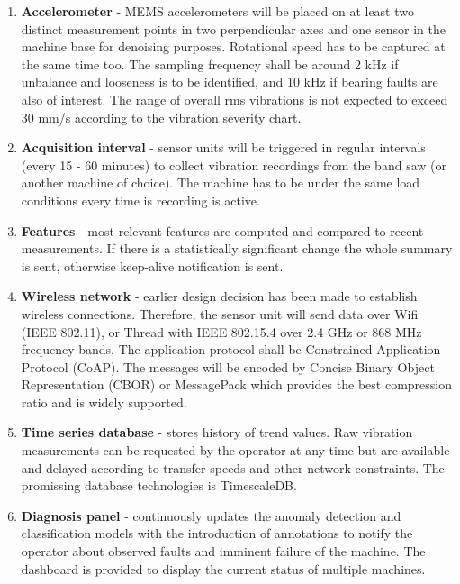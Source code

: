 \begin{enumerate}
\itemsep0pt
\item \textbf{Accelerometer} - MEMS accelerometers will be placed on at least two distinct measurement points in two perpendicular axes and one sensor in the machine base for denoising purposes. Rotational speed has to be captured at the same time too. The sampling frequency shall be around 2 kHz if unbalance and looseness is to be identified, and 10 kHz if bearing faults are also of interest. The range of overall rms vibrations is not expected to exceed 30 mm/s according to the vibration severity chart.
\item \textbf{Acquisition interval} - sensor units will be triggered in regular intervals (every 15 - 60 minutes) to collect vibration recordings from the band saw (or another machine of choice). The machine has to be under the same load conditions every time is recording is active. 
\item \textbf{Features} - most relevant features are computed and compared to recent measurements. If there is a statistically significant change the whole summary is sent, otherwise keep-alive notification is sent. 
\item \textbf{Wireless network} - earlier design decision has been made to establish wireless connections. Therefore, the sensor unit will send data over Wifi (IEEE 802.11), or Thread with IEEE 802.15.4 over 2.4 GHz or 868 MHz frequency bands. The application protocol shall be Constrained Application Protocol (CoAP). The messages will be encoded by Concise Binary Object Representation (CBOR) or MessagePack which provides the best compression ratio and is widely supported.
\item \textbf{Time series database} - stores history of trend values. Raw vibration measurements can be requested by the operator at any time but are available and delayed according to transfer speeds and other network constraints. The promissing database technologies is TimescaleDB.
\item \textbf{Diagnosis panel} - continuously updates the anomaly detection and classification models with the introduction of annotations to notify the operator about observed faults and imminent failure of the machine. The dashboard is provided to display the current status of multiple machines.
\end{enumerate}

